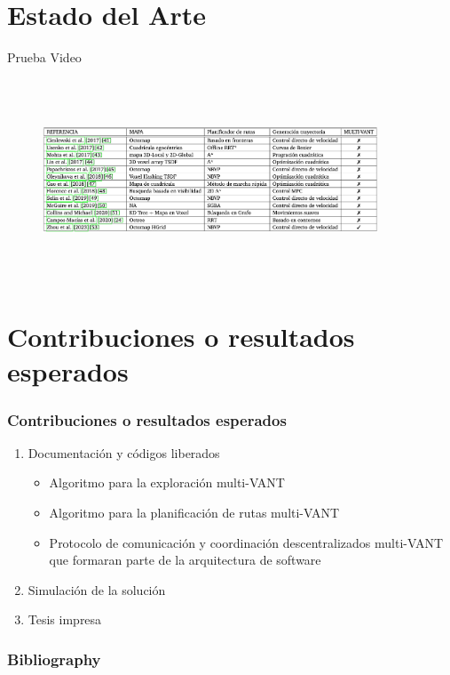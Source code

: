 \documentclass[
	11pt, %
	aspectratio=169, %
]{beamer}
\begin{document}
\section{Estado del Arte}

\begin{frame}{Prueba Video}

  \centering
\end{frame}


\begin{frame}
\begin{figure}
  \centering
  \includegraphics[width=10cm, height=6cm]{estado_del_arte}
\end{figure}
\end{frame}

\section{Contribuciones o resultados esperados}

\begin{frame}

  \frametitle{Contribuciones o resultados esperados}

  \begin{enumerate}
  \item<1-> Documentación y códigos liberados
    \begin{itemize}
    \item Algoritmo para la exploración multi-VANT
    \item Algoritmo para la planificación de rutas multi-VANT
    \item Protocolo de comunicación y coordinación descentralizados multi-VANT que formaran parte de la arquitectura de software
    \end{itemize}
  \item<2-> Simulación de la solución
  \item<3-> Tesis impresa
  \end{enumerate}
  
\end{frame}

\begin{frame}
  \frametitle{Bibliography}
  
  
\end{frame}
\end{document}
